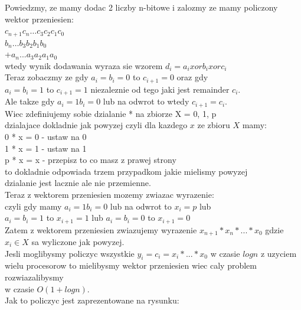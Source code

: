 \documentclass[svgnames]{report}
\begin{document}
Powiedzmy, ze mamy dodac 2 liczby n-bitowe i zalozmy ze mamy policzony wektor przeniesien:\\
$c_{n+1} c_{n} \ldots c_{3} c_{2} c_{1} c_{0}$\\
 $b_{n} \ldots b_{3} b_{2} b_{1} b_{0}$\\
+$a_{n}...a_{3} a_{2} a_{1} a_{0}$\\
wtedy wynik dodawania wyraza sie wzorem $d_i = a_i xor b_i xor c_i$\\

Teraz zobaczmy ze gdy $a_i = b_i = 0$ to $c_{i+1} = 0$ oraz gdy\\
$a_i = b_i = 1$ to $c_{i+1} = 1$ niezaleznie od tego jaki jest remainder $c_i$.\\
Ale takze gdy $a_i = 1 b_i = 0$ lub na odwrot to wtedy $c_{i+1} = c_i$.\\

Wiec zdefiniujemy sobie dzialanie * na zbiorze X = {0, 1, p}\\
dzialajace dokladnie jak powyzej czyli dla kazdego $x$ ze zbioru $X$ mamy:\\
0 * x = 0 - ustaw na 0\\
1 * x = 1 - ustaw na 1\\
p * x = x - przepisz to co masz z prawej strony\\
to dokladnie odpowiada trzem przypadkom jakie mielismy powyzej\\
dzialanie jest lacznie ale nie przemienne.\\

Teraz z wektorem przeniesien mozemy zwiazac wyrazenie:\\
czyli gdy mamy $a_i = 1 b_i = 0$ lub na odwrot to $x_i = p$ lub\\
$a_i = b_i = 1$ to $x_{i+1} = 1$ lub $a_i = b_i = 0$ to $x_{i+1} = 0$\\

Zatem z wektorem przeniesien zwiazujemy wyrazenie $x_{n+1} * x_n * ... * x_0$ gdzie $x_i \in X$ sa wyliczone jak powyzej.\\
Jesli moglibysmy policzyc wszystkie $y_i = c_i = x_i * ... * x_0$ w czasie $logn$ z uzyciem\\
wielu procesorow to mielibysmy wektor przeniesien wiec caly problem rozwiazalibysmy\\
w czasie $O(1 + logn)$.\\

Jak to policzyc jest zaprezentowane na rysunku:\\
\end{document}
